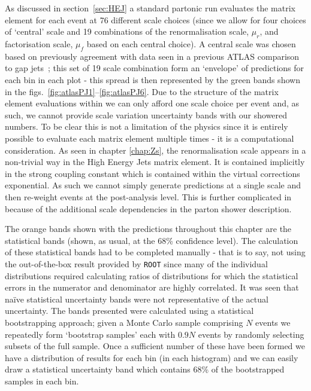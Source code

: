 	As discussed in section~\ref{sec:HEJ} a standard partonic \HEJ run
	evaluates the matrix element for each event at 76 different scale choices (since
	we allow for four choices of `central' scale and 19 combinations of the renormalisation
	scale, $\mu_r$, and factorisation scale, $\mu_f$ based on each central choice).
	A central scale was chosen based on previously agreement with data seen in a previous
	ATLAS comparison to gap jets~\cite{Aad:2011jz}; this set of 19 scale combination
	form an `envelope' of predictions for each bin in each plot - this spread is then
	represented by the green bands shown in the figs.~\eqref{fig:atlasPJ1}--\eqref{fig:atlasPJ6}.
	Due to the structure of the matrix element evaluations within \HEJA
	we can only afford one scale choice per event and, as such, we cannot provide
	scale variation uncertainty bands with our showered numbers.  To be clear this
	is not a limitation of the physics since it is entirely possible to evaluate
	each matrix element multiple times - it is a computational consideration.
	As seen in chapter \ref{chap:Zs}, the renormalisation scale appears in a non-trivial way
	in the High Energy Jets matrix element.  It is contained implicitly in the strong coupling
	constant which is contained within the virtual corrections exponential.  As such
	we cannot simply generate predictions at a single scale and then re-weight events
	at the post-analysis level.  This is further complicated in \HEJA because of the
	additional scale dependencies in the parton shower description.

	The orange bands shown with the \HEJA predictions throughout this chapter are the
	statistical bands (shown, as usual, at the 68\% confidence level).  The calculation
	of these statistical bands had to be completed manually - that is to say, not using
	the out-of-the-box result provided by \texttt{ROOT} since many of the individual
	distributions required calculating ratios of distributions for which the statistical
	errors in the numerator and denominator are highly correlated.  It was seen that
	na\"ive statistical uncertainty bands were not representative of the actual uncertainty.
	The bands presented were calculated using a statistical bootstrapping approach; given
	a Monte Carlo sample comprising $N$ events we repeatedly form `bootstrap samples'
	each with $0.9N$ events by randomly selecting subsets of the full sample.  Once
	a sufficient number of these have been formed we have a distribution of results for
	each bin (in each histogram) and we can easily draw a statistical uncertainty band
	which contains 68\% of the bootstrapped samples in each bin.

